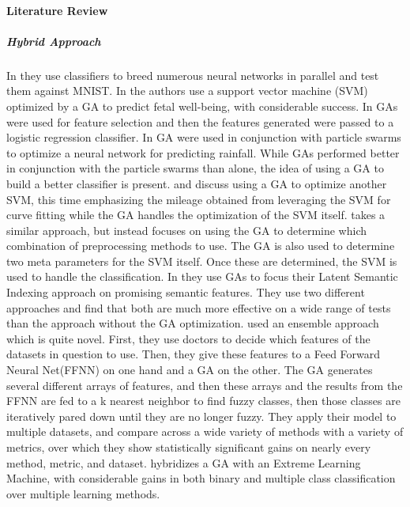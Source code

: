 \paragraph{Literature Review}
\subparagraph{Hybrid Approach}In \cite{schuman_spatiotemporal_2014} they use classifiers to breed numerous neural networks in parallel and test them against MNIST.  In \cite{ocak_medical_2013} the authors use a support vector machine (SVM) optimized by a GA to predict fetal well-being, with considerable success.  In \cite{marchetti_improving_2013} GAs were used for feature selection and then the features generated were passed to a logistic regression classifier.   In \cite{wu_evolving_2015} GA were used in conjunction with particle swarms to optimize a neural network for predicting rainfall.  While GAs performed better in conjunction with the particle swarms than alone, the idea of using a GA to build a better classifier is present.  \cite{chou_optimizing_2014} and \cite{duan_characterization_2014} discuss using a GA to optimize another SVM, this time emphasizing the mileage obtained from leveraging the SVM for curve fitting while the GA handles the optimization of the SVM itself.  \cite{devos_simultaneous_2014} takes a similar approach, but instead focuses on using the GA to determine which combination of preprocessing methods to use.  The GA is also used to determine two meta parameters for the SVM itself.  Once these are determined, the SVM is used to handle the classification.  In \cite{uysal_text_2014} they use GAs to focus their Latent Semantic Indexing approach on promising semantic features.  They use two different approaches and find that both are much more effective on a wide range of tests than the approach without the GA optimization. \cite{salari_novel_2014} used an ensemble approach which is quite novel.  First, they use doctors to decide which features of the datasets in question to use.  Then, they give these features to a Feed Forward Neural Net(FFNN) on one hand and a GA on the other.  The GA generates several different arrays of features, and then these arrays and the results from the FFNN are fed to a k nearest neighbor to find fuzzy classes, then those classes are iteratively pared down until they are no longer fuzzy.  They apply their model to multiple datasets, and compare across a wide variety of methods with a variety of metrics, over which they show statistically significant gains on nearly every method, metric, and dataset.  \cite{alexandre_hybridizing_2015} hybridizes a GA with an Extreme Learning Machine, with considerable gains in both binary and multiple class classification over multiple learning methods.


